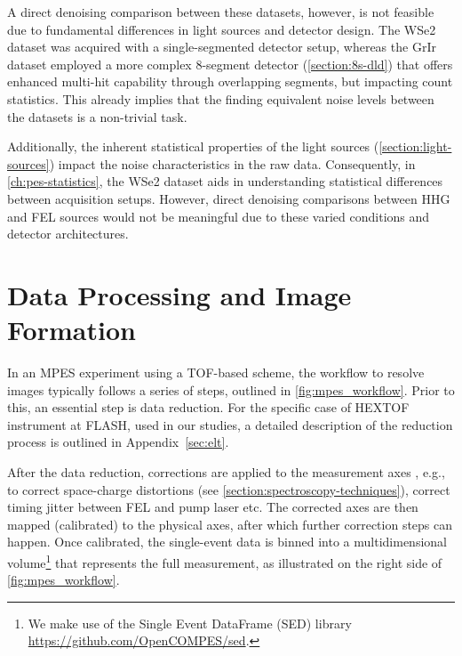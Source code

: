A direct denoising comparison between these datasets, however, is not feasible due to fundamental differences in light sources and detector design. The \gls{WSe2} dataset was acquired with a single-segmented detector setup, whereas the \gls{GrIr} dataset employed a more complex 8-segment detector (\cref{section:8s-dld}) that offers enhanced multi-hit capability through overlapping segments, but impacting count statistics. This already implies that the finding equivalent noise levels between the datasets is a non-trivial task.

Additionally, the inherent statistical properties of the light sources (\cref{section:light-sources}) impact the noise characteristics in the raw data. Consequently, in \cref{ch:pes-statistics}, the \gls{WSe2} dataset aids in understanding statistical differences between acquisition setups. However, direct denoising comparisons between \gls{HHG} and \gls{FEL} sources would not be meaningful due to these varied conditions and detector architectures.

\section{Data Processing and Image Formation}\label{sec:image-formation}

In an \gls{MPES} experiment using a \gls{TOF}-based scheme, the workflow to resolve images typically follows a series of steps, outlined in \cref{fig:mpes_workflow}. Prior to this, an essential step is data reduction. For the specific case of \gls{HEXTOF} instrument at \gls{FLASH}, used in our studies, a detailed description of the reduction process is outlined in Appendix~\ref{sec:elt}.

After the data reduction, corrections are applied to the measurement axes , e.g., to correct space-charge distortions (see \cref{section:spectroscopy-techniques}), correct timing jitter between \gls{FEL} and pump laser etc. The corrected axes are then mapped (calibrated) to the physical axes, after which further correction steps can happen. Once calibrated, the single-event data is binned into a multidimensional volume\footnote{We make use of the Single Event DataFrame (SED) library \href{https://github.com/OpenCOMPES/sed}{https://github.com/OpenCOMPES/sed}.} that represents the full measurement, as illustrated on the right side of \cref{fig:mpes_workflow}.

